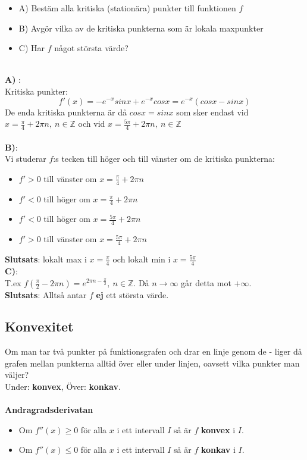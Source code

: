 \documentclass{report}
\begin{document}
{
\begin{itemize}
	\item A) Bestäm alla kritiska (stationära) punkter till funktionen $ f $\\
	\item B) Avgör vilka av de kritiska punkterna som är lokala maxpunkter
	\item C) Har $ f $ något största värde?
\end{itemize}
\dotfill\\
\textbf{A)}  :\\
Kritiska punkter:
\begin{equation*}
	f'(x) = -e^{-x}sinx + e^{-x}cosx = e^{-x}(cosx-sinx)
\end{equation*}
De enda kritiska punkterna är då $ cosx=sinx $ som sker endast vid $ x= \frac{\pi}{4} +2\pi n,\: n \in \mathbb{Z} $ och vid $ x = \frac{5\pi}{4} +2\pi n,\: n \in \mathbb{Z} $\\\\  
\textbf{B)}:\\
Vi studerar $ f $:s tecken till höger och till vänster om de kritiska punkterna:
\begin{itemize}
	\item $ f' > 0 $ till vänster om $ x= \frac{\pi}{4} +2\pi n $
	\item $ f' < 0 $ till höger om $ x = \frac{\pi}{4} +2\pi n $
	\item $ f' < 0 $ till höger om $ x = \frac{5\pi}{4} + 2\pi n $
		\item $ f' > 0 $ till vänster om $ x = \frac{5\pi}{4} + 2\pi n$  
\end{itemize}
\textbf{Slutsats}: lokalt max i $ x = \frac{\pi}{4}  $ och lokalt min i $ x = \frac{5\pi}{4}  $\\

\textbf{C)}:\\
T.ex $ f( \frac{\pi}{2} -2 \pi n ) = e^{2 \pi n - \frac{\pi}{2} },\: n \in \mathbb{Z} $. Då $ n \to \infty $ går detta mot $ + \infty $.\\
\textbf{Slutsats}: Alltså antar $ f $ \textbf{ej} ett största värde.
}

\subsection{Konvexitet}
{
Om man tar två punkter på funktionsgrafen och drar en linje genom de - liger då grafen mellan punkterna alltid över eller under linjen, oavsett vilka punkter man väljer?\\
Under: \textbf{konvex}, Över: \textbf{konkav}.\\\\

\textbf{Andragradsderivatan}
\begin{itemize}
	\item Om $ f''(x) \ge 0 $ för alla $ x $ i ett intervall $ I $ så är $ f $ \textbf{konvex}  i $ I $.
	\item Om $ f''(x) \le 0 $ för alla $ x $ i ett intervall $ I $ så är $ f $ \textbf{konkav} i $ I $.
\end{itemize}
}
\end{document}
